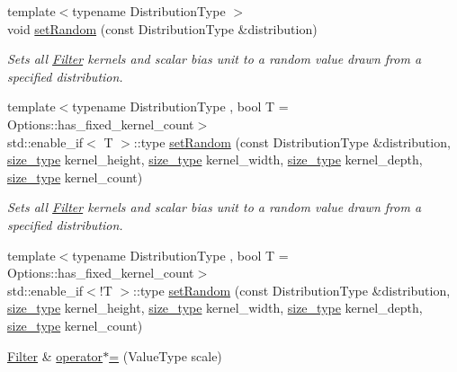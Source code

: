 \begin{DoxyCompactItemize}
\item 
{\footnotesize template$<$typename Distribution\-Type $>$ }\\void \hyperlink{classffnn_1_1layer_1_1convolution_1_1_filter_a9b6cc0b1a995d2baa23ce553e202a78d}{set\-Random} (const Distribution\-Type \&distribution)
\begin{DoxyCompactList}\small\item\em Sets all \hyperlink{classffnn_1_1layer_1_1convolution_1_1_filter}{Filter} kernels and scalar bias unit to a random value drawn from a specified distribution. \end{DoxyCompactList}\item 
{\footnotesize template$<$typename Distribution\-Type , bool T = Options\-::has\-\_\-fixed\-\_\-kernel\-\_\-count$>$ }\\std\-::enable\-\_\-if$<$ T $>$\-::type \hyperlink{classffnn_1_1layer_1_1convolution_1_1_filter_a8e54711d041308aeb854ce78c79fb61a}{set\-Random} (const Distribution\-Type \&distribution, \hyperlink{namespaceffnn_a63b90a2fd70eb76684eac482a51633e5}{size\-\_\-type} kernel\-\_\-height, \hyperlink{namespaceffnn_a63b90a2fd70eb76684eac482a51633e5}{size\-\_\-type} kernel\-\_\-width, \hyperlink{namespaceffnn_a63b90a2fd70eb76684eac482a51633e5}{size\-\_\-type} kernel\-\_\-depth, \hyperlink{namespaceffnn_a63b90a2fd70eb76684eac482a51633e5}{size\-\_\-type} kernel\-\_\-count)
\begin{DoxyCompactList}\small\item\em Sets all \hyperlink{classffnn_1_1layer_1_1convolution_1_1_filter}{Filter} kernels and scalar bias unit to a random value drawn from a specified distribution. \end{DoxyCompactList}\item 
{\footnotesize template$<$typename Distribution\-Type , bool T = Options\-::has\-\_\-fixed\-\_\-kernel\-\_\-count$>$ }\\std\-::enable\-\_\-if$<$!T $>$\-::type \hyperlink{classffnn_1_1layer_1_1convolution_1_1_filter_a64ad81cd3cfd39f2d594618355fe1b71}{set\-Random} (const Distribution\-Type \&distribution, \hyperlink{namespaceffnn_a63b90a2fd70eb76684eac482a51633e5}{size\-\_\-type} kernel\-\_\-height, \hyperlink{namespaceffnn_a63b90a2fd70eb76684eac482a51633e5}{size\-\_\-type} kernel\-\_\-width, \hyperlink{namespaceffnn_a63b90a2fd70eb76684eac482a51633e5}{size\-\_\-type} kernel\-\_\-depth, \hyperlink{namespaceffnn_a63b90a2fd70eb76684eac482a51633e5}{size\-\_\-type} kernel\-\_\-count)
\item 
\hyperlink{classffnn_1_1layer_1_1convolution_1_1_filter}{Filter} \& \hyperlink{classffnn_1_1layer_1_1convolution_1_1_filter_a266f401f904688abe76239cd6563dd3c}{operator$\ast$=} (Value\-Type scale)

\end{DoxyCompactItemize}
